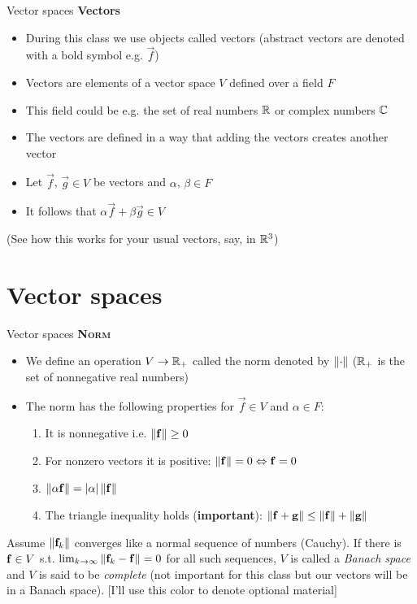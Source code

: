 \begin{frame}{Vector spaces}
	\textbf{Vectors}
	\begin{itemize}
		\item During this class we use objects called \alert{vectors} (abstract vectors are denoted with a bold symbol e.g. $ \vec{f} $)
		\item Vectors are elements of a \alert{vector space} $ V $ defined over a \alert{field} $ F $
		\item This field could be e.g. the set of real numbers $ \mathbb{R} $ or complex numbers $ \mathbb{C} $
	\end{itemize}
	\vspace{1em}
	\begin{itemize}
		\item The vectors are defined in a way that adding the vectors creates another vector
		\item Let $ \vec{f} $, $ \vec{g} \in V$ be vectors and $ \alpha $, $ \beta \in F$
		\item It follows that $ \alpha \vec{f} + \beta \vec{g} \in V $
	\end{itemize}
(See how this works for your usual vectors, say, in $ \mathbb{R}^3 $)
\end{frame}

\section{Vector spaces}


\begin{frame}{Vector spaces}
	\textbf{\textsc{Norm}}
	\begin{itemize}
		\item We define an operation $ V \to \mathbb{R}_{+}$ called the \alert{norm} denoted by $ \left\lVert\cdot\right\rVert $ ($ \mathbb{R}_+ $ is the set of nonnegative real numbers)
		\item The norm has the following properties for $ \vec{f} \in V $ and $ \alpha \in F $:
		\begin{enumerate}
			\item It is nonnegative i.e. $ \left\lVert\mathbf{f}\right\rVert \geq 0 $
			\item For nonzero vectors it is positive: $ \left\lVert\mathbf{f}\right\rVert = 0 \Leftrightarrow \mathbf{f} = 0 $ 
			\item $ \left\lVert\alpha \mathbf{f}\right\rVert = |\alpha| \left\lVert\mathbf{f}\right\rVert$
			\item The triangle inequality holds (\textbf{important}): $ \left\lVert\mathbf{f} + \mathbf{g}\right\rVert \leq \left\lVert\mathbf{f}\right\rVert + \left\lVert\mathbf{g}\right\rVert $
		\end{enumerate}
	\end{itemize}
%
{\color{olive}
Assume $ \left\lVert\mathbf{f}_k\right\rVert $ converges like a normal sequence of numbers (Cauchy). If there is $ \mathbf{f} \in V $ s.t. $ \lim_{k \to \infty} \left\lVert\mathbf{f}_k - \mathbf{f}\right\rVert = 0 $ for all such sequences, 
$ V $ is called a \emph{Banach space} and $ V $ is said to be \emph{complete} (not important for this class but our vectors will be in a Banach space). [I'll use this color to denote optional material]
}
\end{frame}

